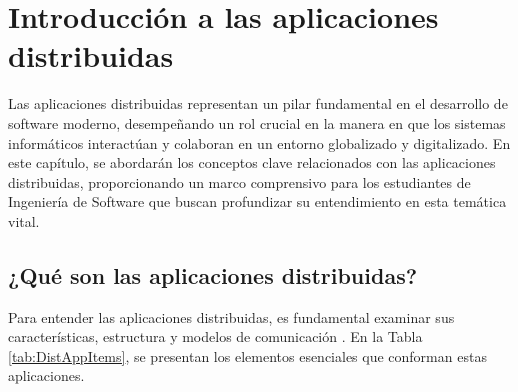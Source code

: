 \chapter{Introducción a las aplicaciones distribuidas}
\noindent
Las aplicaciones distribuidas representan un pilar fundamental en el desarrollo de software moderno, desempeñando un rol crucial en la manera en que los sistemas informáticos interactúan y colaboran en un entorno globalizado y digitalizado. En este capítulo, se abordarán los conceptos clave relacionados con las aplicaciones distribuidas, proporcionando un marco comprensivo para los estudiantes de Ingeniería de Software que buscan profundizar su entendimiento en esta temática vital.

\section{¿Qué son las aplicaciones distribuidas?}
\noindent
Para entender las aplicaciones distribuidas, es fundamental examinar sus características, estructura y modelos de comunicación \cite{Wang2017127}. En la Tabla \ref{tab:DistAppItems}, se presentan los elementos esenciales que conforman estas aplicaciones.


